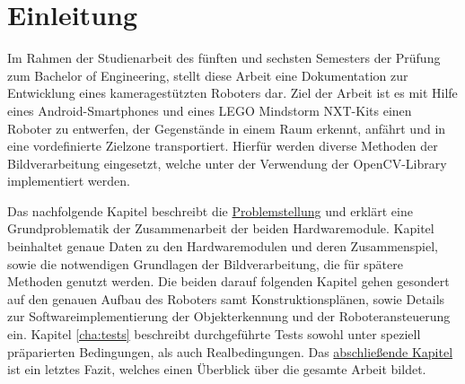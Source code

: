 \chapter{Einleitung}
\label{cha:einleitung}

Im Rahmen der Studienarbeit des fünften und sechsten Semesters der Prüfung zum Bachelor of Engineering, stellt diese Arbeit eine Dokumentation zur Entwicklung eines kameragestützten Roboters dar. Ziel der Arbeit ist es mit Hilfe eines Android-Smartphones und eines LEGO Mindstorm NXT-Kits einen Roboter zu entwerfen, der Gegenstände in einem Raum erkennt, anfährt und in eine vordefinierte Zielzone transportiert. Hierfür werden diverse Methoden der Bildverarbeitung eingesetzt, welche unter der Verwendung der OpenCV-Library \cite{opencv_library} implementiert werden.

Das nachfolgende Kapitel beschreibt die \hyperref[cha:Problemstellung]{Problemstellung} und erklärt eine Grundproblematik der Zusammenarbeit der beiden Hardwaremodule. Kapitel  beinhaltet genaue Daten zu den Hardwaremodulen und deren Zusammenspiel, sowie die notwendigen Grundlagen der Bildverarbeitung, die für spätere Methoden genutzt werden. Die beiden darauf folgenden Kapitel gehen gesondert auf den genauen Aufbau des Roboters samt Konstruktionsplänen, sowie Details zur Softwareimplementierung der Objekterkennung und der Roboteransteuerung ein. Kapitel \ref{cha:tests} beschreibt durchgeführte Tests sowohl unter speziell präparierten Bedingungen, als auch Realbedingungen. Das \hyperref[cha:Fazit]{abschließende Kapitel} ist ein letztes Fazit, welches einen Überblick über die gesamte Arbeit bildet.



